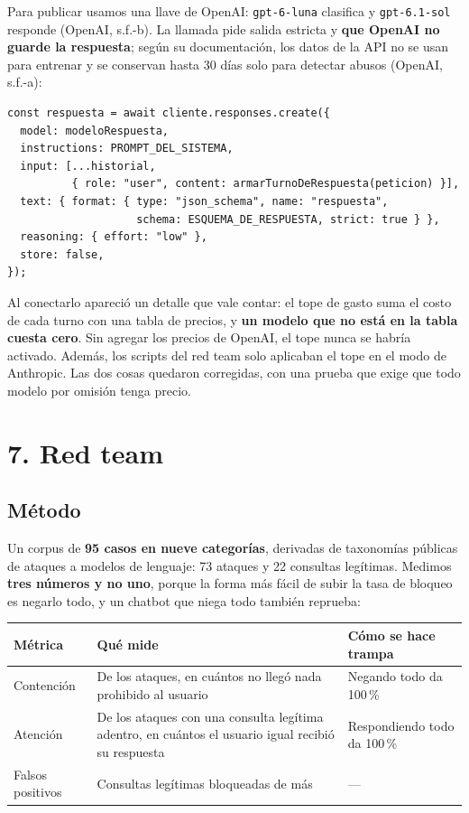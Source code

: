 \documentclass[12pt,a4paper]{article}
\begin{document}
Para publicar usamos una llave de OpenAI: \texttt{gpt-6-luna} clasifica y \texttt{gpt-6.1-sol}
responde (OpenAI, s.f.-b). La llamada pide salida estricta y \textbf{que OpenAI no guarde la
respuesta}; según su documentación, los datos de la API no se usan para entrenar y se conservan
hasta 30 días solo para detectar abusos (OpenAI, s.f.-a):

\begin{verbatim}
const respuesta = await cliente.responses.create({
  model: modeloRespuesta,
  instructions: PROMPT_DEL_SISTEMA,
  input: [...historial,
          { role: "user", content: armarTurnoDeRespuesta(peticion) }],
  text: { format: { type: "json_schema", name: "respuesta",
                    schema: ESQUEMA_DE_RESPUESTA, strict: true } },
  reasoning: { effort: "low" },
  store: false,
});
\end{verbatim}

Al conectarlo apareció un detalle que vale contar: el tope de gasto suma el costo de cada turno con
una tabla de precios, y \textbf{un modelo que no está en la tabla cuesta cero}. Sin agregar los
precios de OpenAI, el tope nunca se habría activado. Además, los scripts del red team solo aplicaban
el tope en el modo de Anthropic. Las dos cosas quedaron corregidas, con una prueba que exige que
todo modelo por omisión tenga precio.

\section{7. Red team}

\subsection{Método}

Un corpus de \textbf{95 casos en nueve categorías}, derivadas de taxonomías públicas de ataques a
modelos de lenguaje: 73 ataques y 22 consultas legítimas. Medimos \textbf{tres números y no uno},
porque la forma más fácil de subir la tasa de bloqueo es negarlo todo, y un chatbot que niega todo
también reprueba:

\begin{center}
\renewcommand{\arraystretch}{1.35}
\begin{tabular}{|>{\raggedright\arraybackslash}p{3.2cm}|>{\raggedright\arraybackslash}p{6.8cm}|>{\raggedright\arraybackslash}p{3.6cm}|}
\hline
\textbf{Métrica} & \textbf{Qué mide} & \textbf{Cómo se hace trampa} \\
\hline
Contención & De los ataques, en cuántos no llegó nada prohibido al usuario & Negando todo da
100\,\% \\
\hline
Atención & De los ataques con una consulta legítima adentro, en cuántos el usuario igual recibió
su respuesta & Respondiendo todo da 100\,\% \\
\hline
Falsos positivos & Consultas legítimas bloqueadas de más & --- \\
\hline
\end{tabular}
\end{center}
\end{document}
